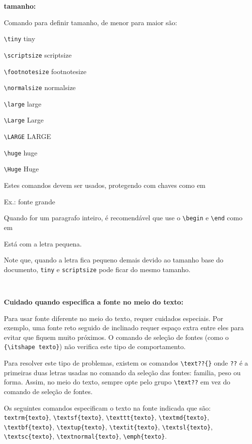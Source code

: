 \documentclass[12pt,a4paper]{article}
\begin{document}
{\bfseries tamanho:}

Comando para definir tamanho, de menor para maior são:

\verb|\tiny| {\tiny tiny}

\verb|\scriptsize| {\scriptsize scriptsize}

\verb|\footnotesize| {\footnotesize footnotesize}

\verb|\normalsize| {\normalsize normalsize}

\verb|\large| {\large large}

\verb|\Large| {\Large Large}

\verb|\LARGE| {\LARGE LARGE}

\verb|\huge| {\huge huge}

\verb|\Huge| {\Huge Huge}

Estes comandos devem ser usados, protegendo com chaves como em

Ex.: {\Large fonte grande}

Quando for um paragrafo inteiro, é recomendável que use o
\verb+\begin+ e \verb+\end+ como em

\begin{small}
    Está com a letra pequena.
\end{small}

Note que, quando a letra fica pequeno demais devido ao tamanho base 
do documento, \texttt{tiny} e \texttt{scriptsize} pode 
ficar do mesmo tamanho.

\

{\bfseries Cuidado quando especifica a fonte no meio do texto:}

Para usar fonte diferente no meio do texto, requer cuidados especiais. 
Por exemplo, uma fonte reto seguido de inclinado requer espaço extra entre 
eles para evitar que fiquem muito próximos.
O comando de seleção de fontes (como o \verb+{\itshape texto}+)
não verifica este tipo de comportamento.

Para resolver este tipo de problemas, existem os comandos \verb|\text??{}| 
onde \verb|??| é a primeiras duas letras usadas no comando da seleção das 
fontes: familia, peso ou forma.
Assim, no meio do texto, sempre opte pelo grupo \verb+\text??+ em vez do comando de seleção de fontes.

Os seguintes comandos especificam o texto na fonte indicada que são:
\verb|textrm{texto}|, \verb|\textsf{texto}|, \verb|\texttt{texto}|, \verb|\textmd{texto}|,
\verb|\textbf{texto}|, \verb|\textup{texto}|, \verb|\textit{texto}|, \verb|\textsl{texto}|,
\verb|\textsc{texto}|, \verb|\textnormal{texto}|, \verb|\emph{texto}|.
\end{document}
